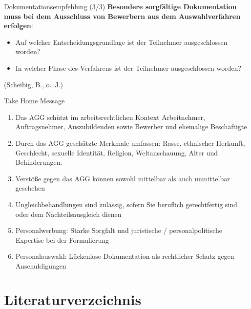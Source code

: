 \documentclass[
  10pt,
  ignorenonframetext,
]{beamer}
\providecommand{\tightlist}{%
  \setlength{\itemsep}{0pt}\setlength{\parskip}{0pt}}
\begin{document}
\begin{frame}{Dokumentationsempfehlung (3/3)}
\protect\hypertarget{dokumentationsempfehlung-33}{}
\textbf{Besondere sorgfältige Dokumentation muss bei dem Ausschluss von
Bewerbern aus dem Auswahlverfahren erfolgen}:

\begin{itemize}
\tightlist
\item
  Auf welcher Entscheidungsgrundlage ist der Teilnehmer ausgeschlossen
  worden?
\item
  In welcher Phase des Verfahrens ist der Teilnehmer ausgeschlossen
  worden?
\end{itemize}

(\protect\hyperlink{ref-ihk_wsb}{Scheibig, B., o.~J.})
\end{frame}

\begin{frame}{Take Home Message}
\protect\hypertarget{take-home-message}{}
\begin{enumerate}
\tightlist
\item
  Das AGG schützt im arbeitsrechtlichen Kontext Arbeitnehmer,
  Auftragsnehmer, Auszubildenden sowie Bewerber und ehemalige
  Beschäftigte
\item
  Durch das AGG geschützte Merkmale umfassen: Rasse, ethnischer
  Herkunft, Geschlecht, sexuelle Identität, Religion, Weltanschauung,
  Alter und Behinderungen.
\item
  Verstöße gegen das AGG können sowohl mittelbar als auch unmittelbar
  geschehen
\item
  Ungleichbehandlungen sind zulässig, sofern Sie beruflich gerechtfertig
  sind oder dem Nachteilsausgleich dienen
\item
  Personalwerbung: Starke Sorgfalt und juristische / personalpolitische
  Expertise bei der Formulierung
\item
  Personalauswahl: Lückenlose Dokumentation als rechtlicher Schutz gegen
  Anschuldigungen
\end{enumerate}
\end{frame}

\hypertarget{literaturverzeichnis}{%
\section*{Literaturverzeichnis}\label{literaturverzeichnis}}
\end{document}
